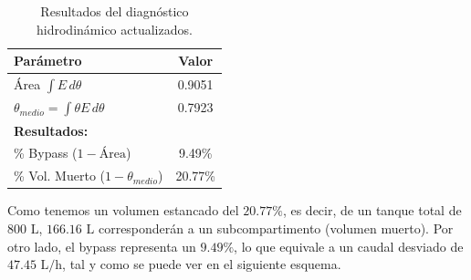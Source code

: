 \begin{table}[htbp]
    \centering
    \begin{tabular}{lc}
        \toprule
        \textbf{Parámetro}                          & \textbf{Valor} \\ \midrule
        Área $\int E \, d\theta$                    & 0.9051         \\
        $\theta_{medio} = \int \theta E \, d\theta$ & 0.7923         \\ \midrule
        \textbf{Resultados:}                        &                \\
        \% Bypass ($1 - \text{Área}$)               & 9.49\%         \\
        \% Vol. Muerto ($1 - \theta_{medio}$)       & 20.77\%        \\ \bottomrule
    \end{tabular}
    \caption{Resultados del diagnóstico hidrodinámico actualizados.}
    \label{tab:diagnostico}
\end{table}

\noindent Como tenemos un volumen estancado del $20.77\%$, es decir, de un tanque total de $800\text{ L}$, $166.16\text{ L}$ corresponderán a un subcompartimento (volumen muerto). Por otro lado, el bypass representa un $9.49\%$, lo que equivale a un caudal desviado de $47.45\text{ L/h}$, tal y como se puede ver en el siguiente esquema.

